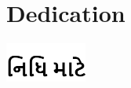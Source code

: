 \chapter*{Dedication}
\thispagestyle{empty}



\vspace*{\fill}
\noindent
\hspace*{-\oddsidemargin}%
\begin{center}
\includegraphics[width=0.2\textwidth]{Figures/dedication_nidhi.png}
\end{center}
\vspace*{\fill}
